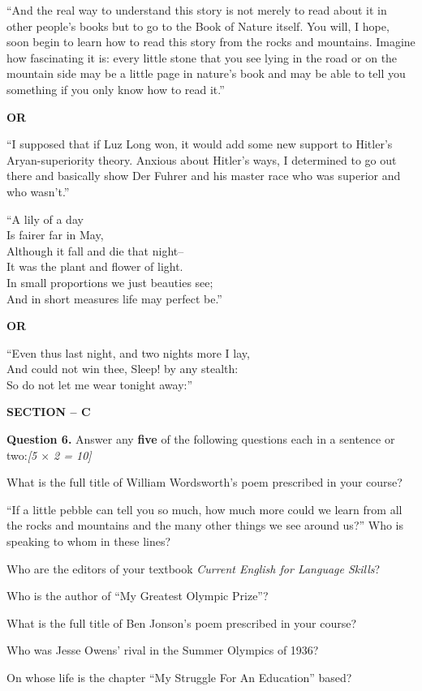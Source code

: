 \documentclass[11pt,a4paper]{article}
\newcommand{\pts}[1]{\hfill   \textit{[#1]}}
\begin{document}
\begin{parts}
  \item ``And the real way to understand this story is not merely to read about it in other people's books but to go to the Book of Nature itself. You will, I hope, soon begin to learn how to read this story from the rocks and mountains. Imagine how fascinating it is: every little stone that you see lying in the road or on the mountain side may be a little page in nature's book and may be able to tell you something if you only know how to read it.''
  \centerline{   \textbf{OR}}
  ``I supposed that if Luz Long won, it would add some new support to Hitler's Aryan-superiority theory. Anxious about Hitler's ways, I determined to go out there and basically show Der Fuhrer and his master race who was superior and who wasn't.''
  \item ``A lily of a day\\
        Is fairer far in May,\\
        Although it fall and die that night--\\
        It was the plant and flower of light.\\
        In small proportions we just beauties see;\\
        And in short measures life may perfect be.''
  \centerline{   \textbf{OR}}
  ``Even thus last night, and two nights more I lay,\\
        And could not win thee, Sleep! by any stealth:\\
        So do not let me wear tonight away:''
\end{parts}

\bigskip

\begin{center}
   \textbf{\large SECTION -- C}
\end{center}




\noindent   \textbf{Question 6.} Answer any   \textbf{five} of the following questions each in a sentence or two:\pts{5 $ \times$ 2 = 10}

\begin{parts}
  \item What is the full title of William Wordsworth's poem prescribed in your course?
  \item ``If a little pebble can tell you so much, how much more could we learn from all the rocks and mountains and the many other things we see around us?'' Who is speaking to whom in these lines?
  \item Who are the editors of your textbook   \textit{Current English for Language Skills}?
  \item Who is the author of ``My Greatest Olympic Prize''?
  \item What is the full title of Ben Jonson's poem prescribed in your course?
  \item Who was Jesse Owens' rival in the Summer Olympics of 1936?
  \item On whose life is the chapter ``My Struggle For An Education'' based?
\end{parts}
\end{document}

